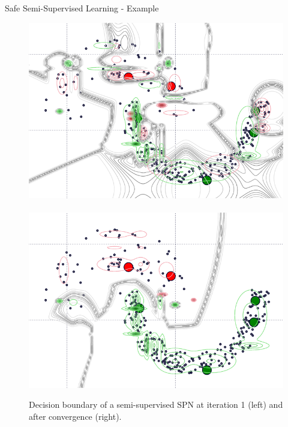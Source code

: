 \begin{frame}{Safe Semi-Supervised Learning - Example}{}
\begin{figure}
    \includegraphics[width=.47\textwidth]{semisupervised_2_2}~
    \includegraphics[width=.47\textwidth]{semisupervised_20_2}
    \caption{Decision boundary of a semi-supervised SPN at iteration 1 (left) and after convergence (right).}
\end{figure}
\end{frame}

